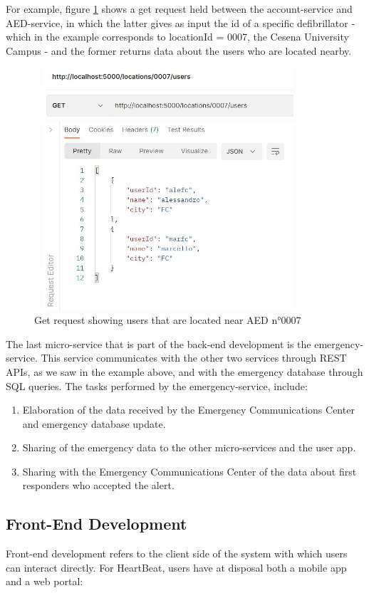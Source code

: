\documentclass[11pt,a4paper]{article}
\begin{document}
For example, figure \ref{fig:get} shows a get request held between the account-service and AED-service, in which the latter gives as input the id of a specific defibrillator - which in the example corresponds to locationId = 0007, the Cesena University Campus - and the former returns data about the users who are located nearby.

\begin{figure}
    \centering
    \includegraphics[height=9cm, width=10cm]{images/get-api.jpg}
    \caption{Get request showing users that are located near AED n°0007}
    \label{fig:get}
\end{figure}

The last micro-service that is part of the back-end development is the emergency-service.
%
This service communicates with the other two services through REST APIs, as we saw in the example above, and with the emergency database through SQL queries.
%
The tasks performed by the emergency-service, include:

\begin{enumerate}
    \item Elaboration of the data received by the Emergency Communications Center and emergency database update.
    \item Sharing of the emergency data to the other micro-services and the user app.
    \item Sharing with the Emergency Communications Center of the data about first responders who accepted the alert.
\end{enumerate}

\subsection{Front-End Development}
Front-end development refers to the client side of the system with which users can interact directly.
%
For HeartBeat, users have at disposal both a mobile app and a web portal:
\end{document}
